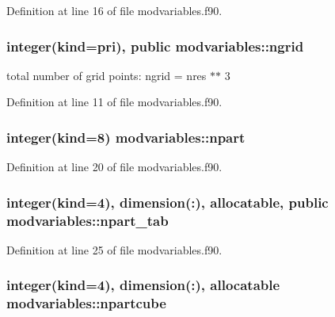 Definition at line 16 of file modvariables.\-f90.

\hypertarget{classmodvariables_ac94629517df3c5cfa8a31f61b2cd0725}{
\subsubsection[{ngrid}]{\setlength{\rightskip}{0pt plus 5cm}integer(kind=pri), public modvariables\-::ngrid}}\label{classmodvariables_ac94629517df3c5cfa8a31f61b2cd0725}


total number of grid points\-: ngrid = nres $\ast$$\ast$ 3 



Definition at line 11 of file modvariables.\-f90.

\hypertarget{classmodvariables_a8c3df9e10fb71cff536986d2a33fa2c7}{
\subsubsection[{npart}]{\setlength{\rightskip}{0pt plus 5cm}integer(kind=8) modvariables\-::npart}}\label{classmodvariables_a8c3df9e10fb71cff536986d2a33fa2c7}


Definition at line 20 of file modvariables.\-f90.

\hypertarget{classmodvariables_a550c917b1362f35e62480385b6ae8863}{
\subsubsection[{npart\-\_\-tab}]{\setlength{\rightskip}{0pt plus 5cm}integer(kind=4), dimension(\-:), allocatable, public modvariables\-::npart\-\_\-tab}}\label{classmodvariables_a550c917b1362f35e62480385b6ae8863}


Definition at line 25 of file modvariables.\-f90.

\hypertarget{classmodvariables_a8cd49c574b692bbeae7029e8d138f58e}{
\subsubsection[{npartcube}]{\setlength{\rightskip}{0pt plus 5cm}integer(kind=4), dimension(\-:), allocatable modvariables\-::npartcube}}\label{classmodvariables_a8cd49c574b692bbeae7029e8d138f58e}



